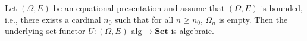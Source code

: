 Let $(\Omega, E)$ be an equational presentation and assume that $(\Omega, E)$ is bounded, i.e., there exists a cardinal $n_0$ such that for all $n \geqslant n_0$, $\Omega_n$ is empty. Then the underlying set functor $U: (\Omega, E)\text{-alg} \longrightarrow \mathbf{Set}$ is algebraic.
